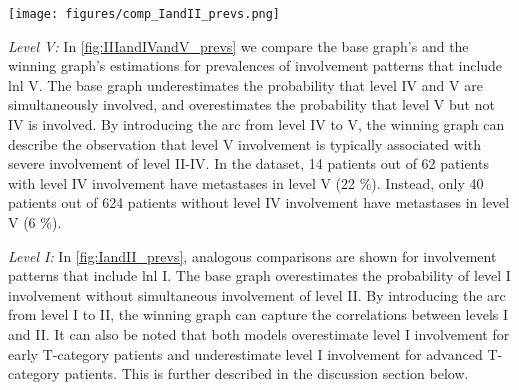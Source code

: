 \documentclass[twocolumn]{article}
\begin{document}
\begin{figure*}
    \begin{centering}
        \texttt{[image: figures/comp\_IandII\_prevs.png]}
        \caption{Comparison of observed and predicted prevalences of \gls{lnl} I and II involvement patterns. The top and bottom panels show the prevalences for early and advanced T-category, respectively. The solid lines are Beta posteriors from the data, while the histograms are predicted prevalences (colored: winning graph, black-hatched: base graph). Blue and red plots indicate overall \gls{lnl} I and II involvement, respectively. Green plots indicate \gls{lnl} I involvement without level II, while orange plots indicate the opposite (\gls{lnl} II without level I). The winning graph has an added edge from \gls{lnl} I to II, which improves the prediction of the rare green pattern. Otherwise, the winnings graph does not meaningfully improve the model's fit to the data. \label{fig:IandII_prevs}}
    \end{centering}
\end{figure*}

{\it Level V:} In \cref{fig:IIIandIVandV_prevs} we compare the base graph's and the winning graph's estimations for prevalences of involvement patterns that include \gls{lnl} V. The base graph underestimates the probability that level IV and V are simultaneously involved, and overestimates the probability that level V but not IV is involved. By introducing the arc from level IV to V, the winning graph can describe the observation that level V involvement is typically associated with severe involvement of level II-IV. In the dataset, 14 patients out of 62 patients with level IV involvement have metastases in level V (22 \%). Instead, only 40 patients out of 624 patients without level IV involvement have metastases in level V (6 \%).

{\it Level I:} In \cref{fig:IandII_prevs}, analogous comparisons are shown for involvement patterns that include \gls{lnl} I. The base graph overestimates the probability of level I involvement without simultaneous involvement of level II. By introducing the arc from level I to II, the winning graph can capture the correlations between levels I and II. It can also be noted that both models overestimate level I involvement for early T-category patients and underestimate level I involvement for advanced T-category patients. This is further described in the discussion section below.
\end{document}

